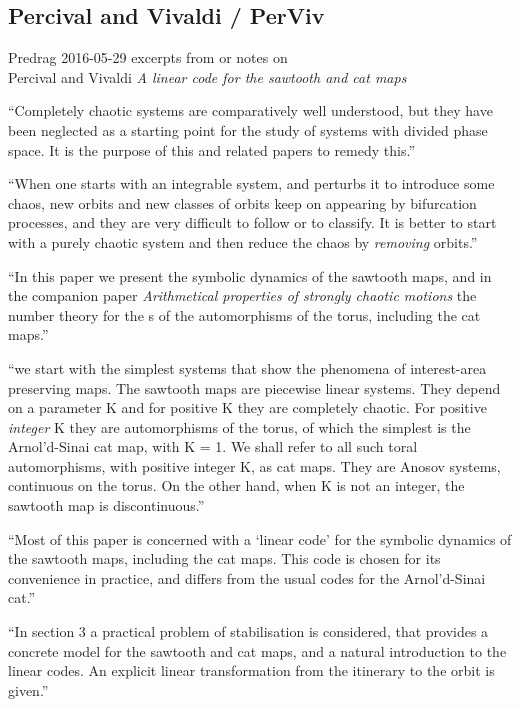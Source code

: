 \subsection{Percival and Vivaldi / PerViv}
\label{sect:PerViv}

Predrag 2016-05-29 excerpts from or notes on\\
Percival and Vivaldi {\em A linear
    code for the sawtooth and cat maps} 

``Completely chaotic systems are comparatively well understood, but they
have been neglected as a starting point for the study of systems with
divided phase space. It is the purpose of this and related papers to
remedy this.''

                                                                    \toCB
``When one starts with an integrable system, and perturbs it to introduce
some chaos, new orbits and new classes of orbits keep on appearing by
bifurcation processes, and they are very difficult to follow or to
classify. It is better to start with a purely chaotic system and then
reduce the chaos by \emph{removing} orbits.''

``In this paper we present the symbolic dynamics of the sawtooth maps,
and in the companion paper {\em Arithmetical properties of
strongly chaotic motions} the number theory for the \po s of
the automorphisms of the torus, including the cat maps.''

``we start with the simplest systems that show the phenomena of
interest-area preserving maps. The sawtooth maps are piecewise linear
systems. They depend on a parameter K and for positive K they are
completely chaotic. For positive \emph{integer} K they are automorphisms
of the torus, of which the simplest is the Arnol'd-Sinai cat map, with K
= 1. We shall refer to all such toral automorphisms, with positive
integer K, as cat maps. They are Anosov systems, continuous on the torus.
On the other hand, when K is not an integer, the sawtooth map is
discontinuous.''

``Most of this paper is concerned with a `linear code' for the symbolic
dynamics of the sawtooth maps, including the cat maps. This code is
chosen for its convenience in practice, and differs from the usual codes
for the Arnol'd-Sinai cat.''

``In section 3 a practical problem of stabilisation is considered, that
provides a concrete model for the sawtooth and cat maps, and a natural
introduction to the linear codes. An explicit linear transformation from
the itinerary to the orbit is given.''


